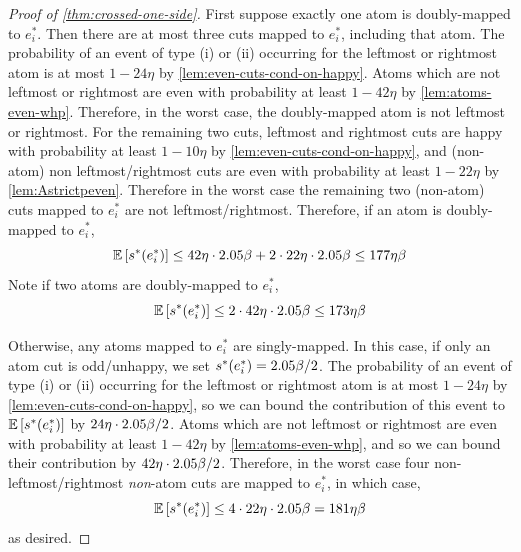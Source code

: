 \begin{proof}[Proof of \cref{thm:crossed-one-side}]
First suppose exactly one atom is doubly-mapped to $e^*_i$. Then there are at most three cuts mapped to $e^*_i$, including that atom. The probability of an event of type (i) or (ii) occurring for the leftmost or rightmost atom is at most $1-24\eta$ by \cref{lem:even-cuts-cond-on-happy}. Atoms which are not leftmost or rightmost are even with probability at least $1-42\eta$ by \cref{lem:atoms-even-whp}. Therefore, in the worst case, the doubly-mapped atom is not leftmost or rightmost. For the remaining two cuts, leftmost and rightmost cuts are happy with probability at least $1-10\eta$ by \cref{lem:even-cuts-cond-on-happy}, and (non-atom) non leftmost/rightmost cuts are even with probability at least $1-22\eta$ by \cref{lem:Astrictpeven}. Therefore in the worst case the remaining two (non-atom) cuts mapped to $e^*_i$ are not leftmost/rightmost. Therefore, if an atom is doubly-mapped to $e^*_i$,
$${\mathbb{E}}\left[s^*(e^*_i)\right]\leq 42\eta \cdot 2.05 \beta + 2\cdot 22\eta \cdot 2.05\beta \le 177\eta \beta$$
Note if two atoms are doubly-mapped to $e^*_i$, 
$${\mathbb{E}}\left[s^*(e^*_i)\right]\leq 2\cdot 42\eta \cdot 2.05\beta \le 173\eta\beta$$

Otherwise, any atoms mapped to $e^*_i$ are singly-mapped. In this case, if only an atom cut is odd/unhappy, we set $s^*(e_i^*) = 2.05\beta/2$. The probability of an event of type (i) or (ii) occurring for the leftmost or rightmost atom is at most $1-24\eta$ by \cref{lem:even-cuts-cond-on-happy}, so we can bound the contribution of this event to ${\mathbb{E}}\left[s^*(e_i^*)\right]$ by $24\eta \cdot 2.05\beta/2$. Atoms which are not leftmost or rightmost are even with probability at least $1-42\eta$ by \cref{lem:atoms-even-whp}, and so we can bound their contribution by $42\eta \cdot 2.05\beta/2$. Therefore, in the worst case four non-leftmost/rightmost \textit{non}-atom cuts are mapped to $e^*_i$, in which case,
$${\mathbb{E}}\left[s^*(e^*_i)\right]\leq 4\cdot 22\eta \cdot 2.05\beta = 181\eta\beta$$ as desired.
\end{proof}

